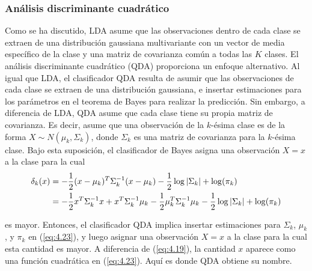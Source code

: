 \subsubsection{Análisis discriminante cuadrático}

Como se ha discutido, LDA asume que las observaciones dentro de cada clase se extraen de una distribución gaussiana multivariante con un vector de media específico de la clase y una matriz de covarianza común a todas las $K$ clases. El análisis discriminante cuadrático (QDA) proporciona un enfoque alternativo. Al igual que LDA, el clasificador QDA resulta de asumir que las observaciones de cada clase se extraen de una distribución gaussiana, e insertar estimaciones para los parámetros en el teorema de Bayes para realizar la predicción. Sin embargo, a diferencia de LDA, QDA asume que cada clase tiene su propia matriz de covarianza. Es decir, asume que una observación de la $k$-ésima clase es de la forma $X \sim N(\mu_k, \Sigma_k)$, donde $\Sigma_k$ es una matriz de covarianza para la $k$-ésima clase. Bajo esta suposición, el clasificador de Bayes asigna una observación $X = x$ a la clase para la cual
\begin{align}
\delta_k(x) &= - \frac{1}{2} (x - \mu_k)^T \Sigma_k^{-1} (x - \mu_k) -\frac{1}{2} \log|\Sigma_k| + \log(\pi_k) \notag \\
&= - \frac{1}{2} x^T \Sigma_k^{-1} x + x^T \Sigma_k^{-1} \mu_k - \frac{1}{2} \mu_k^T \Sigma_k^{-1} \mu_k - \frac{1}{2} \log|\Sigma_k| + \log(\pi_k)
\label{eq:4.23}
\end{align}

es mayor. Entonces, el clasificador QDA implica insertar estimaciones para $\Sigma_k$, $\mu_k$, y $\pi_k$ en (\ref{eq:4.23}), y luego asignar una observación $X = x$ a la clase para la cual esta cantidad es mayor. A diferencia de (\ref{eq:4.19}), la cantidad $x$ aparece como una función cuadrática en (\ref{eq:4.23}). Aquí es donde QDA obtiene su nombre. \\

